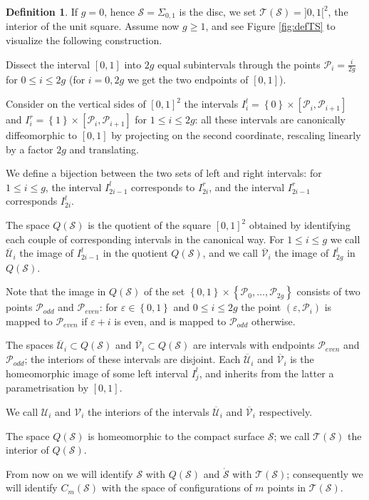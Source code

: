 \documentclass{amsart}
\theoremstyle{plain}
\theoremstyle{definition}
\newtheorem{defn}[thm]  {Definition}
\newcommand{\cP}{\mathcal{P}}
\renewcommand{\S}{\mathcal{S}}
\newcommand{\T}{\mathcal{T}}
\newcommand{\U}{\mathcal{U}}
\newcommand{\V}{\mathcal{V}}
\newcommand{\cms}{C_m(\S)}
\newcommand{\set}[1]{\left\{#1\right\}}
\newcommand{\mrS}{\mathring{\S}}
\renewcommand{\epsilon}{\varepsilon}
\begin{document}
\begin{defn}
\label{defn:TS}
If $g=0$, hence $\S=\Sigma_{0,1}$ is the disc, we set $\T(\S)=]0,1[^2$, the interior of the unit square. Assume
now $g\geq 1$, and see Figure \ref{fig:defTS} to visualize the following construction.

Dissect the interval $[0,1]$ into $2g$ equal subintervals through the points $\cP_i=\frac{i}{2g}$ for $0\leq i\leq 2g$
(for $i=0,2g$ we get the two endpoints of $[0,1]$).

Consider on the vertical sides of $[0,1]^2$ the intervals
$I_i^l=\set{0}\times [\cP_i,\cP_{i+1}]$ and $I_i^r=\set{1}\times [\cP_i,\cP_{i+1}]$ for $1\leq i\leq 2g$:
all these intervals are
canonically diffeomorphic
to $[0,1]$ by projecting on the second coordinate, rescaling linearly by a factor $2g$
and translating.

We define a bijection
between the two sets of left and right intervals:
for $1\leq i\leq g$, the interval $I^l_{2i-1}$ corresponds to $I^r_{2i}$,
and the interval $I^r_{2i-1}$ corresponds $I^l_{2i}$.

The space $Q(\S)$ is the quotient of the square $[0,1]^2$ obtained by identifying each couple
of corresponding intervals in the canonical way. For $1\leq i\leq g$ we call $\overline{\U}_i$ the image
of $I^l_{2i-1}$ in the quotient $Q(\S)$, and we call $\overline{\V}_i$ the image of $I^l_{2g}$ in $Q(\S)$.

Note that the image in $Q(\S)$ of the set $\set{0,1}\times\set{\cP_0,\dots,\cP_{2g}}$ consists of two
points $\cP_{odd}$ and $\cP_{even}$: for $\epsilon\in\set{0,1}$ and $0\leq i\leq 2g$ the point
$(\epsilon,\cP_i)$ is mapped to $\cP_{even}$ if $\epsilon+i$ is even, and is mapped to $\cP_{odd}$
otherwise.

The spaces $\overline{\U}_i\subset Q(\S)$ and $\overline{\V}_i\subset Q(\S)$ are intervals with endpoints $\cP_{even}$ and $\cP_{odd}$;
the interiors of these intervals are disjoint. Each $\overline{\U}_i$ and $\overline{\V}_i$ is the homeomorphic image of
some left interval $I^l_j$, and inherits from the latter a parametrisation by $[0,1]$.

We call $\U_i$ and $\V_i$ the interiors of the intervals $\overline{\U}_i$ and $\overline{\V}_i$ respectively.

The space $Q(\S)$ is homeomorphic to the compact surface $\S$; we call $\T(\S)$ the interior of
$Q(\S)$.

From now on we will identify $\S$ with $Q(\S)$ and $\mrS$ with $\T(\S)$;
consequently we will identify $\cms$ with the
space of configurations of $m$ points in $\T(\S)$.
\end{defn}
\end{document}
